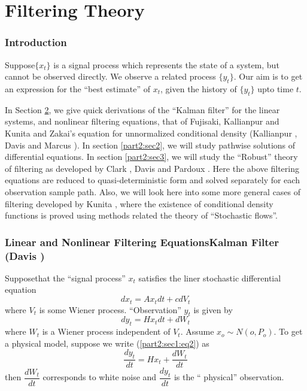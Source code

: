 \part{Filtering Theory} %


\setcounter{section}{-1}
\section{Introduction} %
 
 Suppose\pageoriginale $\{ x_t\}$ is a signal process which represents
 the state of a system, but cannot be observed directly. We observe a
 related process $\{ y_t\}$. Our aim is to get an expression for the
 ``best estimate'' of $x_t$, given the history of $\{y_t\}$ upto time
 $t$.   
 
 In Section \ref{part2:sec1}, we give quick derivations of the
 ``Kalman filter'' for 
 the linear systems, and nonlinear filtering equations, that of
 Fujisaki, Kallianpur and Kunita and Zakai's equation for unnormalized
 conditional density (Kallianpur \cite{key19}, Davis and Marcus
 \cite{key8}). In 
 section \ref{part2:sec2}, we will study pathwise solutions of differential
 equations. In section \ref{part2:sec3}, we will study the ``Robust'' theory of
 filtering as developed by Clark \cite{key5}, Davis \cite{key10} and Pardoux
 \cite{key20}. Here the above filtering equations are reduced to
 quasi-deterministic form and solved separately for each observation
 sample path. Also, we will look here into some more general cases of
 filtering developed by Kunita \cite{key17}, where the existence of
 conditional density functions is proved using methods related the
 theory of ``Stochastic flows''.  
  
 \section[Linear and Nonlinear Filtering Equations....]{Linear and
   Nonlinear Filtering Equations\hfill\break Kal\-man Filter 
   (Davis \cite{key11})}\label{part2:sec1}%
  
 Suppose\pageoriginale that the ``signal process'' $x_t$ satisfies the
 liner stochastic differential equation 
 \begin{equation*}
   dx_t  =  Ax_t  dt  +  c  dV_t  \tag{1}\label{part2:sec1:eq1}
 \end{equation*}
 where $V_t$ is some Wiener process. ``Observation'' $y_t$ is given by 
 \begin{equation*}
   dy_t =  Hx_t  dt  +   dW_t   \tag{2}\label{part2:sec1:eq2}
 \end{equation*}
 where $W_t$ is a Wiener process independent of $V_t$. Assume $x_o
 \sim N(o,P_o)$. To get a physical model, suppose we write (\ref{part2:sec1:eq2}) as   
 $$
 \frac{dy_t}{dt} = Hx_t + \frac{dW_t}{dt}
 $$
 then $\dfrac{dW_t}{dt}$ corresponds to white noise and
 $\dfrac{dy_t}{dt}$ is the `` physical'' observation. 
 
